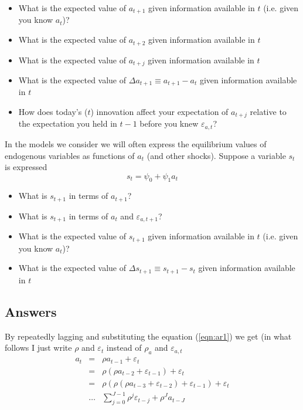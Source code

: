 \documentclass[authoryear,11pt]{elsarticle}
\begin{document}
\begin{itemize}
\item	What is the expected value of $a_{t+1}$ given information available in $t$ (i.e. given you know $a_{t}$)?
\item	What is the expected value of $a_{t+2}$ given information available in $t$
\item	What is the expected value of $a_{t+j}$ given information available in $t$
\item	What is the expected value of $\Delta a_{t+1} \equiv a_{t+1} - a_{t}$ given information available in $t$
\item	How does today's ($t$) innovation affect your expectation of $a_{t+j}$ relative to the expectation you held in $t-1$ before you knew $\varepsilon_{a,t}$?
\end{itemize}

In the models we consider we will often express the equilibrium values of endogenous variables as functions of $a_{t}$ (and other shocks). Suppose a variable $s_{t}$ is expressed
\[
s_{t} = \psi_{0} + \psi_{1} a_{t}
\]
\begin{itemize}
\item	What is $s_{t+1}$ in terms of $a_{t+1}$?
\item	What is $s_{t+1}$ in terms of $a_{t}$ and $\varepsilon_{a,t+1}$?
\item	What is the expected value of $s_{t+1}$ given information available in $t$ (i.e. given you know $a_{t}$)?
\item	What is the expected value of $\Delta s_{t+1} \equiv s_{t+1} - s_{t}$ given information available in $t$
\end{itemize}

\subsection*{Answers}
By repeatedly lagging and substituting the equation (\ref{eqn:ar1}) we get (in what follows I just write $\rho$ and $\varepsilon_{t}$ instead of  $\rho_{a}$ and $\varepsilon_{a,t}$
\begin{eqnarray*}
a_{t} 	&=&	\rho a_{t-1} + \varepsilon_{t} \\
		&=&	\rho(\rho a_{t-2} + \varepsilon_{t-1}) + \varepsilon_{t} \\
		&=&	\rho(\rho(\rho a_{t-3} + \varepsilon_{t-2}) + \varepsilon_{t-1}) + \varepsilon_{t}	\\
		&\ldots& \sum\limits_{j=0}^{J-1} \rho^{j} \varepsilon_{t-j} + \rho^{J}a_{t-J}
\end{eqnarray*}
\end{document}
